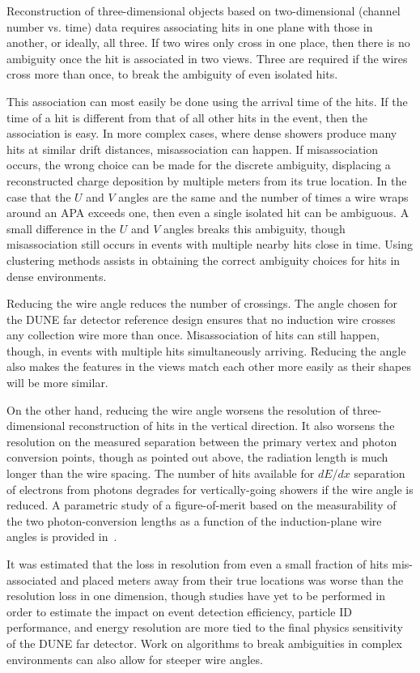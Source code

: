 Reconstruction of three-dimensional objects based on two-dimensional
(channel number vs. time) data requires associating hits in one plane
with those in another, or ideally, all three.  If two wires only cross
in one place, then there is no ambiguity once the hit is associated in
two views.  Three are required if the wires cross more than once, to
break the ambiguity of even isolated hits.

This association can most easily be done using the arrival time of the
hits.  If the time of a hit is different from that of all other hits
in the event, then the association is easy.  In more complex cases,
where dense showers produce many hits at similar drift distances,
misassociation can happen.  If misassociation occurs, the wrong choice
can be made for the discrete ambiguity, displacing a reconstructed
charge deposition by multiple meters from its true location.  In the
case that the $U$ and $V$ angles are the same and the number of times
a wire wraps around an APA exceeds one, then even a single isolated
hit can be ambiguous.  A small difference in the $U$ and $V$ angles
breaks this ambiguity, though misassociation still occurs in events
with multiple nearby hits close in time.  Using clustering methods
assists in obtaining the correct ambiguity choices for hits in dense
environments.

Reducing the wire angle reduces the number of crossings.  The angle
chosen for the DUNE far detector reference design ensures that no
induction wire crosses any collection wire more than once.
Misassociation of hits can still happen, though, in events with
multiple hits simultaneously arriving.  Reducing the angle also makes
the features in the views match each other more easily as their shapes
will be more similar.

On the other hand, reducing the wire angle worsens the resolution of
three-dimensional reconstruction of hits in the vertical direction.
It also worsens the resolution on the measured separation between the
primary vertex and photon conversion points, though as pointed out
above, the radiation length is much longer than the wire spacing.  The
number of hits available for $dE/dx$ separation of electrons from
photons degrades for vertically-going showers if the wire angle is
reduced.  A parametric study of a figure-of-merit based on the
measurability of the two photon-conversion lengths as a function of
the induction-plane wire angles is provided
in~\cite{wire-orientation}.

It was estimated that the loss in resolution from even a small fraction
of hits mis-associated and placed meters away from their true
locations was worse than the resolution loss in one
dimension\cite{docdb-8981}, though studies have yet to be performed
in order to estimate the impact on event detection efficiency,
particle ID performance, and energy resolution are more tied to the
final physics sensitivity of the DUNE far detector.  Work on
algorithms to break ambiguities in complex environments can also allow
for steeper wire angles.

